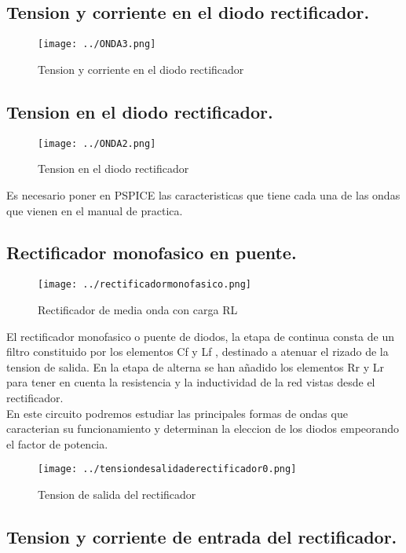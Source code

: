 \documentclass[11pt,a4paper]{article}
\begin{document}
\subsection{Tension y corriente en el diodo rectificador.}

\begin{figure}[h]
\centering
\texttt{[image: ../ONDA3.png]} 
\caption{Tension y corriente en el diodo rectificador}
\end{figure}

\subsection{Tension en el diodo rectificador.}

\begin{figure}[h]
\centering
\texttt{[image: ../ONDA2.png]}  
\caption{Tension en el diodo rectificador}
\end{figure}

Es necesario poner en PSPICE las caracteristicas que tiene cada una de las ondas que vienen en el manual de practica.

\subsection{Rectificador monofasico en puente.}

\begin{figure}[h]
\centering
\texttt{[image: ../rectificadormonofasico.png]}  
\caption{Rectificador de media onda con carga RL}
\end{figure}


El rectificador monofasico o puente de diodos, la etapa de continua consta de un filtro constituido por los elementos Cf y Lf , destinado a atenuar el rizado de la tension de salida. En la etapa de alterna se han añadido los elementos Rr y Lr para tener en cuenta la resistencia y la inductividad de la red vistas desde el rectificador.\\
En este circuito podremos estudiar las principales formas de ondas que caracterian su funcionamiento y determinan la eleccion de los diodos empeorando el factor de potencia.

\begin{figure}[h]
\centering
\texttt{[image: ../tensiondesalidaderectificador0.png]} 
\caption{Tension de salida del rectificador}
\end{figure}

\subsection{Tension y corriente de entrada del rectificador.}
\end{document}
